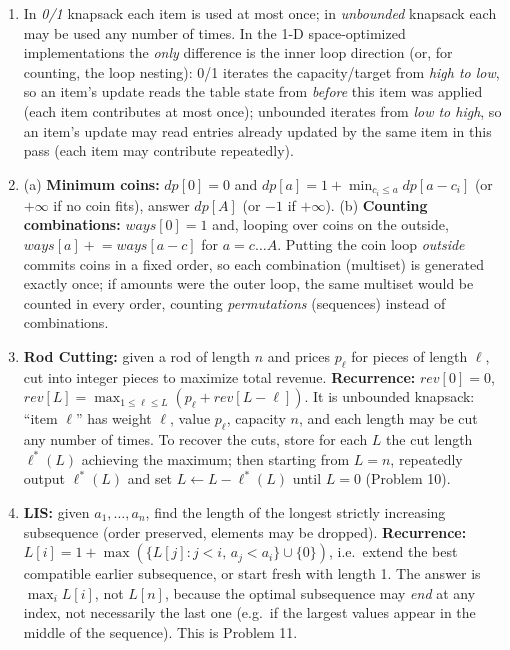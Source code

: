 \documentclass[11pt]{article}
\begin{document}
\begin{enumerate}[label=\textbf{A\arabic*.}, leftmargin=2.2em]
\item In \emph{0/1} knapsack each item is used at most once; in \emph{unbounded} knapsack
each may be used any number of times. In the 1-D space-optimized implementations the
\emph{only} difference is the inner loop direction (or, for counting, the loop nesting):
0/1 iterates the capacity/target from \emph{high to low}, so an item's update reads the
table state from \emph{before} this item was applied (each item contributes at most once);
unbounded iterates from \emph{low to high}, so an item's update may read entries already
updated by the same item in this pass (each item may contribute repeatedly).

\item (a) \textbf{Minimum coins:} $\mathit{dp}[0]=0$ and $\mathit{dp}[a] = 1 + \min_{c_i
\le a} \mathit{dp}[a - c_i]$ (or $+\infty$ if no coin fits), answer $\mathit{dp}[A]$ (or
$-1$ if $+\infty$). (b) \textbf{Counting combinations:} $\mathit{ways}[0]=1$ and, looping
over coins on the outside, $\mathit{ways}[a] \mathrel{+}= \mathit{ways}[a - c]$ for $a = c
\ldots A$. Putting the coin loop \emph{outside} commits coins in a fixed order, so each
combination (multiset) is generated exactly once; if amounts were the outer loop, the same
multiset would be counted in every order, counting \emph{permutations} (sequences) instead
of combinations.

\item \textbf{Rod Cutting:} given a rod of length $n$ and prices $p_\ell$ for pieces of
length $\ell$, cut into integer pieces to maximize total revenue. \textbf{Recurrence:}
$\mathit{rev}[0]=0$, $\mathit{rev}[L] = \max_{1 \le \ell \le L}(p_\ell + \mathit{rev}[L -
\ell])$. It is unbounded knapsack: ``item $\ell$'' has weight $\ell$, value $p_\ell$,
capacity $n$, and each length may be cut any number of times. To recover the cuts, store
for each $L$ the cut length $\ell^*(L)$ achieving the maximum; then starting from $L = n$,
repeatedly output $\ell^*(L)$ and set $L \gets L - \ell^*(L)$ until $L = 0$ (Problem 10).

\item \textbf{LIS:} given $a_1,\ldots,a_n$, find the length of the longest strictly
increasing subsequence (order preserved, elements may be dropped). \textbf{Recurrence:}
$L[i] = 1 + \max(\{L[j] : j < i,\, a_j < a_i\} \cup \{0\})$, i.e.\ extend the best
compatible earlier subsequence, or start fresh with length 1. The answer is $\max_i L[i]$,
not $L[n]$, because the optimal subsequence may \emph{end} at any index, not necessarily
the last one (e.g.\ if the largest values appear in the middle of the sequence). This is
Problem 11.


\end{enumerate}
\end{document}
